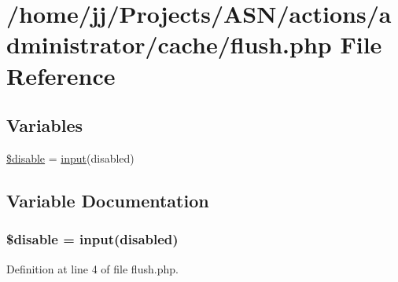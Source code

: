 \hypertarget{flush_8php}{}\section{/home/jj/\+Projects/\+A\+S\+N/actions/administrator/cache/flush.php File Reference}
\label{flush_8php}
\subsection*{Variables}
\begin{DoxyCompactItemize}
\item 
\hyperlink{flush_8php_a86e93e1fa43b9e36a257ca69b6107fba}{\$disable} = \hyperlink{ossn_8lib_8input_8php_a64ebee98b041c4f75f71ed3cd73cc8ed}{input}(\textquotesingle{}disabled\textquotesingle{})
\end{DoxyCompactItemize}


\subsection{Variable Documentation}
\subsubsection[{\texorpdfstring{\$disable}{$disable}}]{\setlength{\rightskip}{0pt plus 5cm}\$disable = {\bf input}(\textquotesingle{}disabled\textquotesingle{})}\hypertarget{flush_8php_a86e93e1fa43b9e36a257ca69b6107fba}{}\label{flush_8php_a86e93e1fa43b9e36a257ca69b6107fba}


Definition at line 4 of file flush.\+php.

